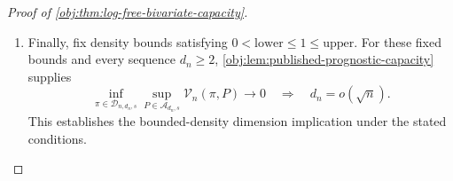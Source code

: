 \documentclass[11pt]{article}
\begin{document}
\begin{proof}[Proof of \cref{obj:thm:log-free-bivariate-capacity}]
\begin{enumerate}
Conversely, if \(B_n/n\to0\), then \(a_s(n,d_n)\to0\). The constructed admissible kernel gives, for every \(n\geq2\),
\[
0\leq R_s(n,d_n)
\leq
\sup_{m\in\mathcal H_{d_n,s}}
\mathcal L_{n,d_n,s}(\pi^\star_{n,d_n},m)
\leq3072a_s(n,d_n).
\]
The right-hand side tends to zero, so squeezing gives \(R_s(n,d_n)\to0\). Thus
\[
R_s(n,d_n)\longrightarrow0
\quad\Longleftrightarrow\quad
\frac{\binom{d_n}{2}}n\longrightarrow0
\quad\Longleftrightarrow\quad
d_n=o(\sqrt n).
\]

\item
Finally, fix density bounds satisfying
\(0<\mathrm{lower}\leq1\leq\mathrm{upper}\).
For these fixed bounds and every sequence \(d_n\geq2\),
\cref{obj:lem:published-prognostic-capacity} supplies
\[
\inf_{\pi\in\mathcal D_{n,d_n,s}}
\sup_{P\in\mathcal A_{d_n,s}}\mathcal V_n(\pi,P)
\longrightarrow0
\quad\Longrightarrow\quad
d_n=o(\sqrt n).
\]
This establishes the bounded-density dimension implication under the stated conditions.
\end{enumerate}
\end{proof}
\end{document}
